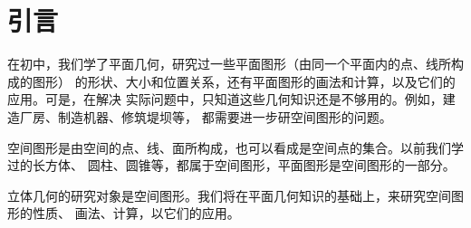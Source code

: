 \chapter*{引言}

在初中，我们学了平面几何，研究过一些平面图形（由同一个平面内的点、线所构成的图形）
的形状、大小和位置关系，还有平面图形的画法和计算，以及它们的应用。可是，在解决
实际问题中，只知道这些几何知识还是不够用的。例如，建造厂房、制造机器、修筑堤坝等，
都需要进一步研空间图形的问题。

空间图形是由空间的点、线、面所构成，也可以看成是空间点的集合。以前我们学过的长方体、
圆柱、圆锥等，都属于空间图形，平面图形是空间图形的一部分。

立体几何的研究对象是空间图形。我们将在平面几何知识的基础上，来研究空间图形的性质、
画法、计算，以它们的应用。
